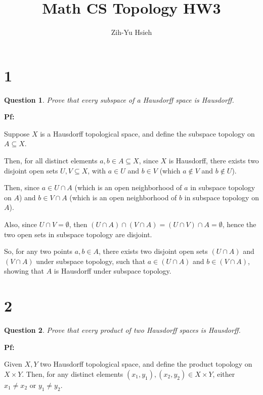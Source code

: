 \documentclass{article}
\title{Math CS Topology HW3}
\author{Zih-Yu Hsieh}
\newtheorem{question}{Question}
\begin{document}
\maketitle

\section*{1}
\begin{myBox}[]{}
    \begin{question}
        Prove that every subspace of a Hausdorff space is Hausdorff.
    \end{question}
\end{myBox}

\textbf{Pf:}

Suppose $X$ is a Hausdorff topological space, and define the subspace topology on $A\subseteq X$.

Then, for all distinct elements $a,b\in A\subseteq X$, since $X$ is Hausdorff, there exists two disjoint open sets $U,V\subseteq X$, 
with $a\in U$ and $b\in V$ (which $a\notin V$ and $b\notin U$).

Then, since $a\in U\cap A$ (which is an open neighborhood of $a$ in subspace topology on $A$) and $b\in V\cap A$ (which is an open neighborhood of $b$ in subspace topology on $A$).

Also, since $U\cap V=\emptyset$, then $(U\cap A)\cap (V\cap A)=(U\cap V)\cap A=\emptyset$, hence the two open sets in subspace topology are disjoint.

\hfill

So, for any two points $a,b\in A$, there exists two disjoint open sets $(U\cap A)$ and $(V\cap A)$ under subspace topology,
such that $a\in (U\cap A)$ and $b\in (V\cap A)$, showing that $A$ is Hausdorff under subspace topology.

\hfill

\hfill

\section*{2}
\begin{myBox}[]{}
    \begin{question}
        Prove that every product of two Hausdorff spaces is Hausdorff.
    \end{question}
\end{myBox}

\textbf{Pf:}

Given $X,Y$ two Hausdorff topological space, and define the product topology on $X\times Y$.
Then, for any distinct elements $(x_1,y_1),(x_2,y_2)\in X\times Y$, either $x_1\neq x_2$ or $y_1\neq y_2$.
\end{document}
